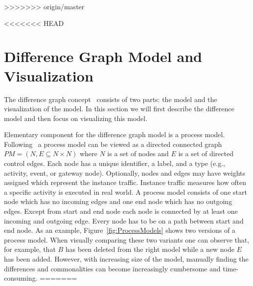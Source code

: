\documentclass{llncs}
\begin{document}
\begin{keywords}
>>>>>>> origin/master


<<<<<<< HEAD
\section{Difference Graph Model and Visualization} %
\label{sec:DiffgraphModel}
The difference graph concept~\cite{lit:VisuApprDiffAnalysis} consists of two parts: the model and the visualization of the model. In this section we will first describe the difference model and then focus on visualizing this model.

Elementary component for the difference graph model is a process model. Following~\cite{lit:VisuApprDiffAnalysis} a process model can be viewed as a directed connected graph $PM = (N, E \subseteq N \times N)$ where $N$ is a set of nodes and $E$ is a set of directed control edges. Each node has a unique identifier, a label, and a type (e.g., activity, event, or gateway node). Optionally, nodes and edges may have weights assigned which represent the instance traffic. Instance traffic measures how often a specific activity is executed in real world. A process model consists of one start node which has no incoming edges and one end node which has no outgoing edges. Except from start and end node each node is connected by at least one incoming and outgoing edge. Every node has to be on a path between start and end node. As an example, Figure~\ref{fig:ProcessModels} shows two versions of a process model. When visually comparing these two variants one can observe that, for example, that $B$ has been deleted from the right model while a new node $E$ has been added. However, with increasing size of the model, manually finding the differences and commonalities can become increasingly cumbersome and time-consuming.
=======


\end{keywords}
\end{document}
